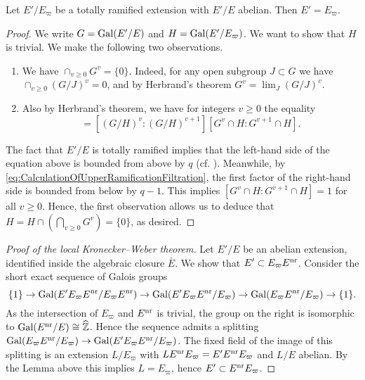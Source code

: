 \documentclass[../main.tex]{subfiles}
\begin{document}
\begin{lem}\label{lem:LocalKronWebAlmostDone}
  Let $E'/E_\varpi$ be a totally ramified extension with $E'/E$ abelian.
  Then $E' = E_\varpi$. 
\begin{proof}
  We write $G = \operatorname{Gal}(E'/E)$ and $H = \operatorname{Gal}(E'/E_\varpi)$. We want to show that 
  $H$ is trivial. We make the following two observations.
  \begin{enumerate}
    \item We have $\cap_{v \geq 0} G^v = \{0\}$. Indeed, for any open subgroup
      $J \subset G$ we have $\cap_{v \geq 0} (G/J)^v = 0$, and by Herbrand's theorem
      $G^v = \lim_J (G/J)^v$. 
    \item Also by Herbrand's theorem, we have for integers $v \geq 0$ the equality
      \begin{equation*}
        [G^v : G^{v+1}] = [(G/H)^v : (G/H)^{v+1}] [G^v \cap H : G^{v+1} \cap H].
      \end{equation*}
  \end{enumerate}
  The fact that $E'/E$ is totally ramified implies that the left-hand side of
  the equation above is bounded from above by $q$ (cf. \cite[Lemma 3]{gold1981local}).
  Meanwhile, by \eqref{eq:CalculationOfUpperRamificationFiltration}, the first factor
  of the right-hand side is bounded from below by $q-1$. This implies $[G^v \cap H :
  G^{v+1} \cap H] = 1$ for all $v \geq 0$. Hence, the first observation allows us
  to deduce that $H = H \cap \left( \bigcap_{v \geq 0} G^v \right) = \{0\}$, as desired.
\end{proof}
\end{lem}

\begin{proof}[Proof of the local Kronecker--Weber theorem]
  Let $E'/E$ be an abelian extension, identified inside the 
  algebraic closure $\bar E$. We show that $E' \subset E_\varpi E^{\mathrm{nr}}$. 
  Consider the short exact sequence of Galois groups
  \begin{equation*}
    \{1\} \to \operatorname{Gal}(E' E_\varpi E^{\mathrm{nr}}/ E_\varpi E^{\mathrm{nr}}) \to 
    \operatorname{Gal}(E' E_\varpi E^{\mathrm{nr}}/ E_\varpi) \to 
    \operatorname{Gal}(E_\varpi E^{\mathrm{nr}}/ E_\varpi) \to  \{1\}.
  \end{equation*}
  As the intersection of  $E_\varpi$ and $E^{\mathrm{nr}}$ is trivial, the group on the right
  is isomorphic to $\operatorname{Gal}(E^{\mathrm{nr}} /E) \cong \widehat {\mathbb{Z}}$. Hence the sequence admits 
  a splitting $\operatorname{Gal}(E_\varpi E^{\mathrm{nr}}/ E_\varpi) \to \operatorname{Gal}(E' E_\varpi E^{\mathrm{nr}}/
  E_\varpi)$. The fixed field of the image of this splitting is an extension
  $L/E_\varpi$ with $L E^{\mathrm{nr}} E_\varpi = E' E^{\mathrm{nr}} E_\varpi$ and $L/E$ abelian.
  By the Lemma above this implies $L = E_\varpi$, hence $E' \subset E^{\mathrm{nr}} E_\varpi$. 
\end{proof}


\end{document}
